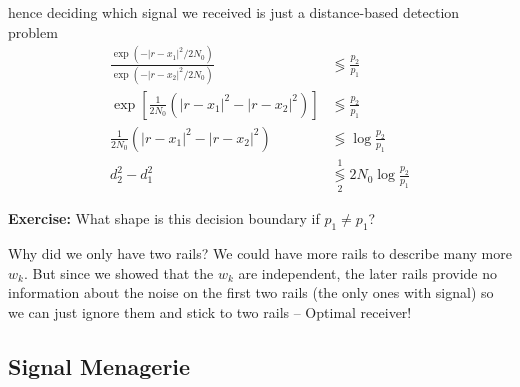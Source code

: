 \documentclass[12pt]{report}
\newcommand{\abs}[1]{\left\vert #1 \right\vert}
\newenvironment*{exercise}[1][red]{
    \begin{tcolorbox}[
        parbox=false,
        colback=#1!5!white,
        colframe=#1!75!black,
        breakable
    ]}
    {\end{tcolorbox}}
\begin{document}
    \begin{center}
\end{center}

hence deciding which signal we received is just a distance-based detection problem 
\begin{align*}
    \frac{\exp(-\abs{r - x_1}^2/2N_0)}{\exp(-\abs{r - x_2}^2/2N_0)} &\lessgtr \frac{p_2}{p_1}\\ 
    \exp\left[\frac{1}{2N_0} \left(\abs{r - x_1}^2 - \abs{r - x_2}^2\right)\right] &\lessgtr \frac{p_2}{p_1}\\ 
    \frac{1}{2N_0} \left(\abs{r - x_1}^2 - \abs{r - x_2}^2\right) &\lessgtr \log \frac{p_2}{p_1}\\
    d_2^2 - d_1^2 &\overset{1}{\underset{2}{\lessgtr}} 2N_0 \log \frac{p_2}{p_1}
\end{align*}

\begin{exercise}
    \textbf{Exercise:} What shape is this decision boundary if $p_1 \neq p_1$? 
\end{exercise}

Why did we only have two rails? We could have more rails to describe many more $w_k$. But since we showed that the $w_k$ are independent, the later rails provide no information about the noise on the first two rails (the only ones with signal) so we can just ignore them and stick to two rails -- Optimal receiver! 

\subsection{Signal Menagerie}
\end{document}
